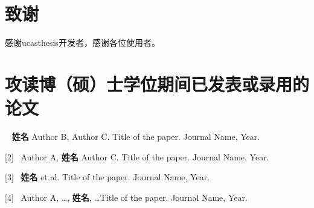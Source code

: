 \chapter[致谢]{致\quad 谢}%

感谢ucasthesis开发者，感谢各位使用者。



\chapter{攻读博（硕）士学位期间已发表或录用的论文}



\begin{flushleft}
[1]~ \textbf{姓名} Author B, Author C. Title of the paper. Journal Name, Year.

[2]~ Author A, \textbf{姓名} Author C. Title of the paper. Journal Name, Year.

[3]~ \textbf{姓名} et al. Title of the paper. Journal Name, Year.

[4]~ Author A, \dots, \textbf{姓名}, \dots Title of the paper. Journal Name, Year.
\end{flushleft}

\cleardoublepage[plain]%
